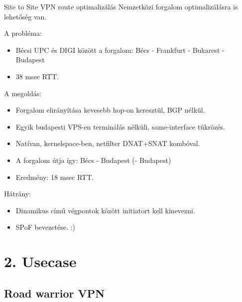 \documentclass[aspectratio=169]{beamer}
\begin{document}
\begin{frame}{Site to Site VPN route optimalizálás}
	\pause
	Nemzetközi forgalom optimalizálásra is lehetőség van.

	A probléma:
	\begin{itemize}
		\item Bécsi UPC és DIGI között a forgalom: Bécs - Frankfurt - Bukarest - Budapest
			\pause
		\item 38 msec RTT.
			\pause
	\end{itemize}
	A megoldás:
	\begin{itemize}
		\item Forgalom elirányítása kevesebb hop-on keresztül, BGP nélkül.
			\pause
		\item Egyik budapesti VPS-en terminálás nélküli, same-interface tükrözés.
			\pause
		\item Natívan, kernelspace-ben, netfilter DNAT+SNAT kombóval.
			\pause
		\item A forgalom útja így: Bécs - Budapest (- Budapest)
			\pause
		\item Eredmény: 18 msec RTT.
	\end{itemize}
	Hátrány:
	\begin{itemize}
			\pause
		\item Dinamikus című végpontok között initiatort kell kinevezni.
			\pause
		\item SPoF bevezetése. :)
	\end{itemize}
\end{frame}

\section{2. Usecase}
\begin{frame}[plain]
	\fontsize{50}{60} 
\end{frame}
\subsection{Road warrior VPN}
\end{document}
